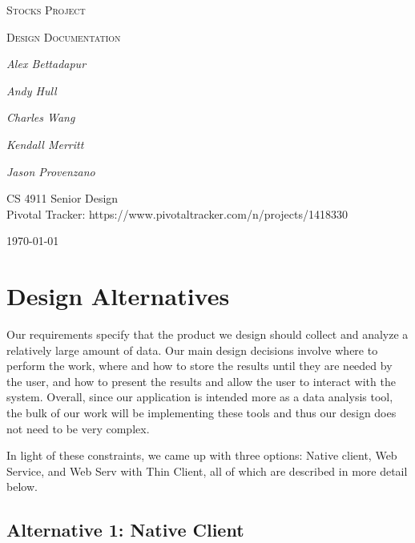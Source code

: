 \documentclass[12pt,a4paper]{article}
\begin{document}
\begin{titlepage}
	\centering
	{\scshape\LARGE Stocks Project \par}
	\vspace{1cm}
	{\scshape\Large Design Documentation\par}
	\vspace{2cm}
	{\Large\itshape Alex Bettadapur\par}
	\vspace{1cm}
	{\Large\itshape Andy Hull\par}
	\vspace{1cm}
	{\Large\itshape Charles Wang\par}
	\vspace{1cm}
	{\Large\itshape Kendall Merritt\par}
	\vspace{1cm}
	{\Large\itshape Jason Provenzano\par}
	{\Large\itshape\par}
	\vfill
	CS 4911 Senior Design\\
Pivotal Tracker: https://www.pivotaltracker.com/n/projects/1418330
	\vfill

	{\large \today\par}
\end{titlepage}
 
\tableofcontents
 \newpage
\section{Design Alternatives}

Our requirements specify that the product we design should collect and analyze a relatively large amount of data. Our main design decisions involve where to perform the work, where and how to store the results until they are needed by the user, and how to present the results and allow the user to interact with the system. Overall, since our application is intended more as a data analysis tool, the bulk of our work will be implementing these tools and thus our design does not need to be very complex.
\vspace{.1cm}

\indent In light of these constraints, we came up with three options: Native client, Web Service, and Web Serv with Thin Client, all of which are described in more detail below. 

\subsection{Alternative 1: Native Client}
\end{document}
